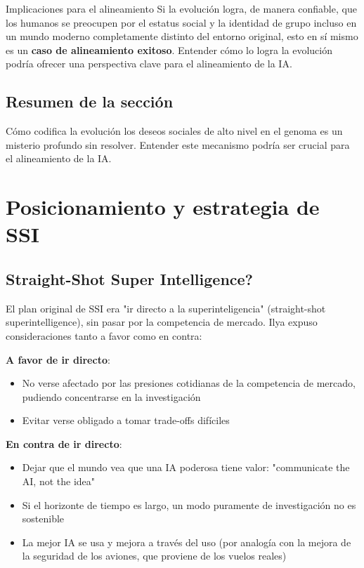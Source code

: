 \documentclass[a4paper]{article}
\begin{document}
\begin{importantbox}{Implicaciones para el alineamiento}
Si la evolución logra, de manera confiable, que los humanos se preocupen por el estatus social y la identidad de grupo incluso en un mundo moderno completamente distinto del entorno original, esto en sí mismo es un \textbf{caso de alineamiento exitoso}. Entender cómo lo logra la evolución podría ofrecer una perspectiva clave para el alineamiento de la IA.
\end{importantbox}

\subsection{Resumen de la sección}

Cómo codifica la evolución los deseos sociales de alto nivel en el genoma es un misterio profundo sin resolver. Entender este mecanismo podría ser crucial para el alineamiento de la IA.


\section{Posicionamiento y estrategia de SSI}

\subsection{Straight-Shot Super Intelligence?}

El plan original de SSI era "ir directo a la superinteligencia" (straight-shot superintelligence), sin pasar por la competencia de mercado. Ilya expuso consideraciones tanto a favor como en contra:

\textbf{A favor de ir directo}:
\begin{itemize}
    \item No verse afectado por las presiones cotidianas de la competencia de mercado, pudiendo concentrarse en la investigación
    \item Evitar verse obligado a tomar trade-offs difíciles
\end{itemize}

\textbf{En contra de ir directo}:
\begin{itemize}
    \item Dejar que el mundo vea que una IA poderosa tiene valor: "communicate the AI, not the idea"
    \item Si el horizonte de tiempo es largo, un modo puramente de investigación no es sostenible
    \item La mejor IA se usa y mejora a través del uso (por analogía con la mejora de la seguridad de los aviones, que proviene de los vuelos reales)
\end{itemize}
\end{document}
